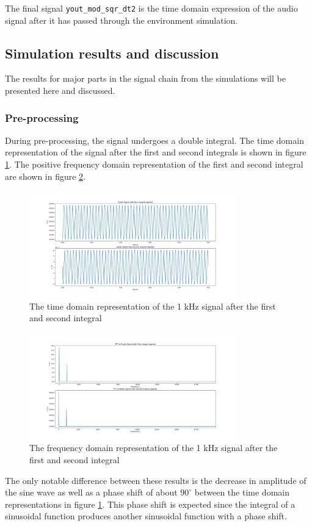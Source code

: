 The final signal \texttt{yout\_mod\_sqr\_dt2} is the time domain expression of the audio signal after it has passed through the environment simulation.

\newpage
\subsection{Simulation results and discussion}
The results for major parts in the signal chain from the simulations will be presented here and discussed.
\subsubsection{Pre-processing}
During pre-processing, the signal undergoes a double integral. The time domain representation of the signal after the first and second integrals is shown in figure \ref{fig:tdomint12}. The positive frequency domain representation of the first and second integral are shown in figure \ref{fig:fdomint12}.

\begin{figure}[ht!]
    \centering
    \includegraphics[width=0.8\textwidth]{Figures/SigSimulation/simint1int2.png}
    \caption{The time domain representation of the 1 kHz signal after the first and second integral}
    \label{fig:tdomint12}
\end{figure}
\begin{figure}[ht!]
    \centering
    \includegraphics[width=0.8\textwidth]{Figures/SigSimulation/fftsimint1int2.png}
    \caption{The frequency domain representation of the 1 kHz signal after the first and second integral}
    \label{fig:fdomint12}
\end{figure}
\newpage
The only notable difference between these results is the decrease in amplitude of the sine wave as well as a phase shift of about $90^\circ$ between the time domain representations in figure \ref{fig:tdomint12}. This phase shift is expected since the integral of a sinusoidal function produces another sinusoidal function with a phase shift.\\

